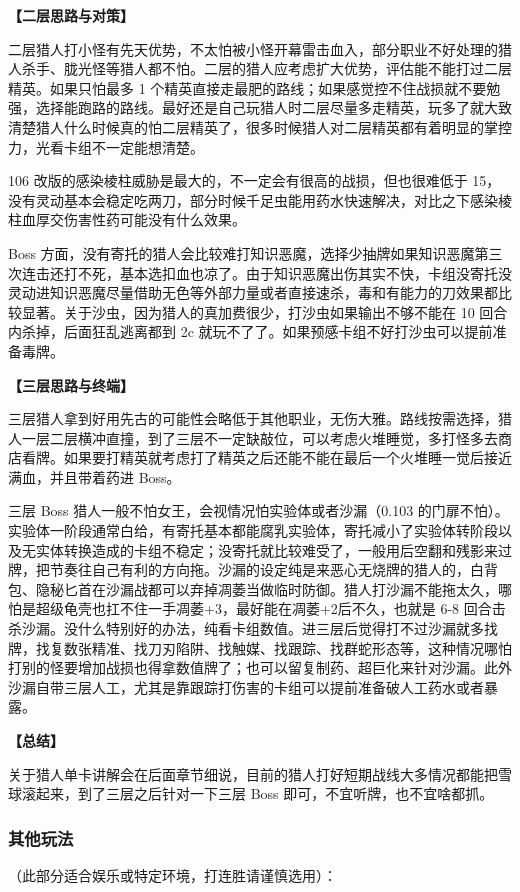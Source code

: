 \documentclass[12pt, a4paper]{article}
\begin{document}
\textbf{【二层思路与对策】}

二层猎人打小怪有先天优势，不太怕被小怪开幕雷击血入，部分职业不好处理的猎人杀手、胧光怪等猎人都不怕。二层的猎人应考虑扩大优势，评估能不能打过二层精英。如果只怕最多 1 个精英直接走最肥的路线；如果感觉控不住战损就不要勉强，选择能跑路的路线。最好还是自己玩猎人时二层尽量多走精英，玩多了就大致清楚猎人什么时候真的怕二层精英了，很多时候猎人对二层精英都有着明显的掌控力，光看卡组不一定能想清楚。

106 改版的感染棱柱威胁是最大的，不一定会有很高的战损，但也很难低于 15，没有灵动基本会稳定吃两刀，部分时候千足虫能用药水快速解决，对比之下感染棱柱血厚交伤害性药可能没有什么效果。

Boss 方面，没有寄托的猎人会比较难打知识恶魔，选择少抽牌如果知识恶魔第三次连击还打不死，基本选扣血也凉了。由于知识恶魔出伤其实不快，卡组没寄托没灵动进知识恶魔尽量借助无色等外部力量或者直接速杀，毒和有能力的刀效果都比较显著。关于沙虫，因为猎人的真加费很少，打沙虫如果输出不够不能在 10 回合内杀掉，后面狂乱逃离都到 2c 就玩不了了。如果预感卡组不好打沙虫可以提前准备毒牌。

\textbf{【三层思路与终端】}

三层猎人拿到好用先古的可能性会略低于其他职业，无伤大雅。路线按需选择，猎人一层二层横冲直撞，到了三层不一定缺敲位，可以考虑火堆睡觉，多打怪多去商店看牌。如果要打精英就考虑打了精英之后还能不能在最后一个火堆睡一觉后接近满血，并且带着药进 Boss。

三层 Boss 猎人一般不怕女王，会视情况怕实验体或者沙漏（0.103 的门扉不怕）。实验体一阶段通常白给，有寄托基本都能腐乳实验体，寄托减小了实验体转阶段以及无实体转换造成的卡组不稳定；没寄托就比较难受了，一般用后空翻和残影来过牌，把节奏往自己有利的方向拖。沙漏的设定纯是来恶心无烧牌的猎人的，白背包、隐秘匕首在沙漏战都可以弃掉凋萎当做临时防御。猎人打沙漏不能拖太久，哪怕是超级龟壳也扛不住一手凋萎+3，最好能在凋萎+2后不久，也就是 6-8 回合击杀沙漏。没什么特别好的办法，纯看卡组数值。进三层后觉得打不过沙漏就多找牌，找复数张精准、找刀刃陷阱、找触媒、找跟踪、找群蛇形态等，这种情况哪怕打别的怪要增加战损也得拿数值牌了；也可以留复制药、超巨化来针对沙漏。此外沙漏自带三层人工，尤其是靠跟踪打伤害的卡组可以提前准备破人工药水或者暴露。

\textbf{【总结】}

关于猎人单卡讲解会在后面章节细说，目前的猎人打好短期战线大多情况都能把雪球滚起来，到了三层之后针对一下三层 Boss 即可，不宜听牌，也不宜啥都抓。

\subsubsection{其他玩法}
（此部分适合娱乐或特定环境，打连胜请谨慎选用）：
\end{document}
